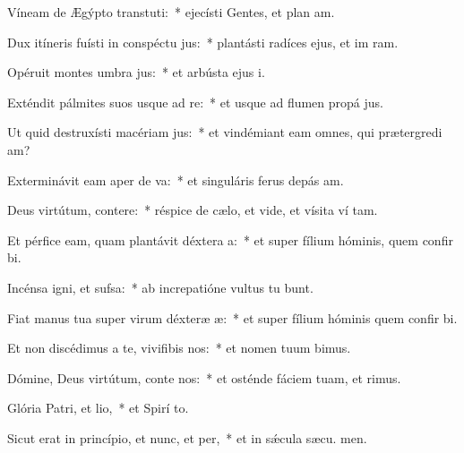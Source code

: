 \item Víneam de Ægýpto transtuti:~* ejecísti Gentes, et plan am.
\item Dux itíneris fuísti in conspéctu jus:~* plantásti radíces ejus, et im ram.
\item Opéruit montes umbra jus:~* et arbústa ejus  i.
\item Exténdit pálmites suos usque ad re:~* et usque ad flumen propá jus.
\item Ut quid destruxísti macériam jus:~* et vindémiant eam omnes, qui prætergredi am?
\item Exterminávit eam aper de va:~* et singuláris ferus depás  am.
\item Deus virtútum, contere:~* réspice de cælo, et vide, et vísita ví tam.
\item Et pérfice eam, quam plantávit déxtera a:~* et super fílium hóminis, quem confir bi.
\item Incénsa igni, et sufsa:~* ab increpatióne vultus tu bunt.
\item Fiat manus tua super virum déxteræ æ:~* et super fílium hóminis quem confir bi.
\item Et non discédimus a te, vivifibis nos:~* et nomen tuum bimus.
\item Dómine, Deus virtútum, conte nos:~* et osténde fáciem tuam, et  rimus.
\item Glória Patri, et lio,~* et Spirí to.
\item Sicut erat in princípio, et nunc, et per,~* et in sǽcula sæcu. men.
